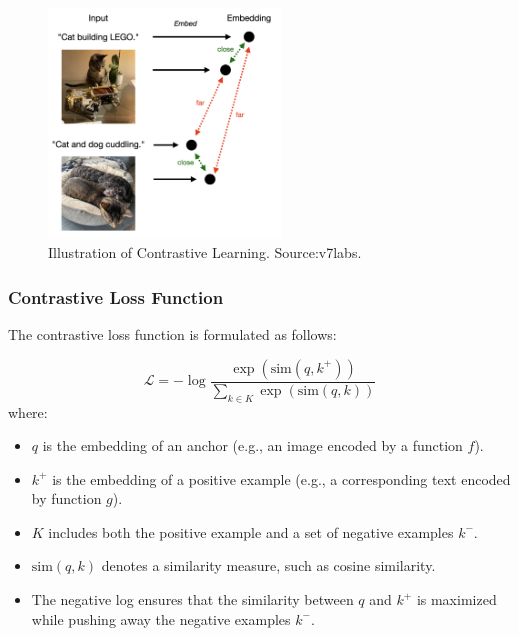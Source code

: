 \begin{figure}[h]
    \centering
    \includegraphics[width=0.55\textwidth]{IMAGES/contrastive_CLIP.png}
    \caption[Illustration of Contrastive Learning]{Illustration of Contrastive Learning. Source:v7labs\footnotemark.}
    \label{fig:contrastive_learning}
\end{figure}
\subsubsection{Contrastive Loss Function}
The contrastive loss function is formulated as follows:

\begin{equation}
\mathcal{L} = -\log \frac{\exp(\text{sim}(q, k^+))}{\sum_{k \in K} \exp(\text{sim}(q, k))}
\end{equation}
where:
\begin{itemize}
    \item \( q \) is the embedding of an anchor (e.g., an image encoded by a function \( f \)).
    \item \( k^+ \) is the embedding of a positive example (e.g., a corresponding text encoded by function \( g \)).
    \item \( K \) includes both the positive example and a set of negative examples \( k^- \).
    \item \( \text{sim}(q, k) \) denotes a similarity measure, such as cosine similarity.
    \item The negative log ensures that the similarity between \( q \) and \( k^+ \) is maximized while pushing away the negative examples \( k^- \).
\end{itemize}
